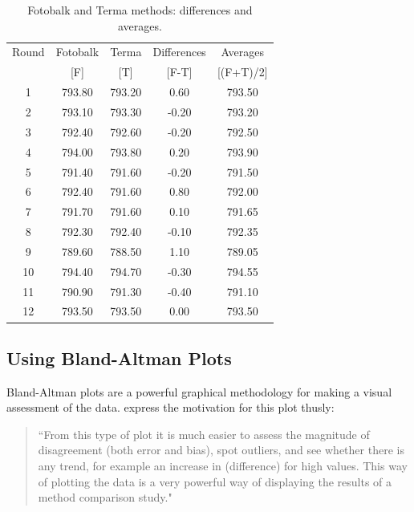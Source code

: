 \documentclass[12pt, a4paper]{report}
\begin{document}
	\begin{table}[h!]
		\renewcommand\arraystretch{0.7}%
		\begin{center}
			\begin{tabular}{|c||c|c||c|c|}
				\hline
				Round & Fotobalk  & Terma  & Differences  & Averages  \\
				&  [F] & [T] & [F-T] &  [(F+T)/2] \\
				\hline
				1 & 793.80 & 793.20 & 0.60 & 793.50 \\
				2 & 793.10 & 793.30 & -0.20 & 793.20 \\
				3 & 792.40 & 792.60 & -0.20 & 792.50 \\
				4 & 794.00 & 793.80 & 0.20 & 793.90 \\
				5 & 791.40 & 791.60 & -0.20 & 791.50 \\
				6 & 792.40 & 791.60 & 0.80 & 792.00 \\
				7 & 791.70 & 791.60 & 0.10 & 791.65 \\
				8 & 792.30 & 792.40 & -0.10 & 792.35 \\
				9 & 789.60 & 788.50 & 1.10 & 789.05 \\
				10 & 794.40 & 794.70 & -0.30 & 794.55 \\
				11 & 790.90 & 791.30 & -0.40 & 791.10 \\
				12 & 793.50 & 793.50 & 0.00 & 793.50 \\
				
				\hline
			\end{tabular}
			\caption{Fotobalk and Terma methods: differences and averages.}
		\end{center}
	\end{table}
	
	\newpage
	
	
	\subsection{Using Bland-Altman Plots}
	Bland-Altman plots are a powerful graphical methodology for making
	a visual assessment of the data. \citet*{BA83} express the
	motivation for this plot thusly:
	\begin{quote}
		``From this type of plot it is much easier to assess the magnitude
		of disagreement (both error and bias), spot outliers, and see
		whether there is any trend, for example an increase in
		(difference) for high values. This way of plotting the data is a
		very powerful way of displaying the results of a method comparison
		study."
	\end{quote}
	
\end{document}
